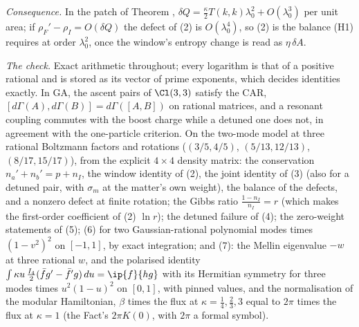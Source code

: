 \emph{Consequence.} In the patch of Theorem , $\delta Q = \tfrac{\kappa}{2}T(k,k)\lambda_{0}^{2} + O(\lambda_{0}^{3})$ per unit area; if $\rho_{F}' - \rho_{I} = O(\delta Q)$ the defect of (2) is $O(\lambda_{0}^{4})$, so (2) is the balance (H1) requires at order $\lambda_{0}^{2}$, once the window's entropy change is read as $\eta\,\delta A$.

\emph{The check.} Exact arithmetic throughout; every logarithm is that of a positive rational and is stored as its vector of prime exponents, which decides identities exactly. In GA, the ascent pairs of $\Cl(3,3)$ satisfy the CAR, $[d\Gamma(A), d\Gamma(B)] = d\Gamma([A,B])$ on rational matrices, and a resonant coupling commutes with the boost charge while a detuned one does not, in agreement with the one-particle criterion. On the two-mode model at three rational Boltzmann factors and rotations ($(3/5, 4/5)$, $(5/13, 12/13)$, $(8/17, 15/17)$), from the explicit $4\times 4$ density matrix: the conservation $n_{a}' + n_{b}' = p + n_{I}$, the window identity of (2), the joint identity of (3) (also for a detuned pair, with $\sigma_{m}$ at the matter's own weight), the balance of the defects, and a nonzero defect at finite rotation; the Gibbs ratio $\frac{1 - n_{I}}{n_{I}} = r$ (which makes the first-order coefficient of (2) $\ln r$); the detuned failure of (4); the zero-weight statements of (5); (6) for two Gaussian-rational polynomial modes times $(1 - v^{2})^{2}$ on $[-1, 1]$, by exact integration; and (7): the Mellin eigenvalue $-w$ at three rational $w$, and the polarised identity $\int\kappa u\,\tfrac{I_{4}}{2}(\bar f g' - \bar f' g)\,du = \ip{f}{hg}$ with its Hermitian symmetry for three modes times $u^{2}(1 - u)^{2}$ on $[0, 1]$, with pinned values, and the normalisation of the modular Hamiltonian, $\beta$ times the flux at $\kappa = \tfrac14, \tfrac23, 3$ equal to $2\pi$ times the flux at $\kappa = 1$ (the Fact's $2\pi K(0)$, with $2\pi$ a formal symbol).
